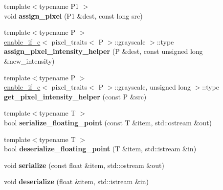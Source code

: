 \begin{DoxyCompactItemize}
\item 
\hypertarget{namespacedlib_a5f5a56be49a2fdda3449976b8234ec72}{
{\footnotesize template$<$typename P1 $>$ }\\void {\bfseries assign\_\-pixel} (P1 \&dest, const long src)}
\label{namespacedlib_a5f5a56be49a2fdda3449976b8234ec72}

\item 
\hypertarget{namespacedlib_a93ad558cb34ff5f74d81a831b4a71bc3}{
{\footnotesize template$<$typename P $>$ }\\\hyperlink{structboost_1_1enable__if__c}{enable\_\-if\_\-c}$<$ pixel\_\-traits$<$ P $>$::grayscale $>$::type {\bfseries assign\_\-pixel\_\-intensity\_\-helper} (P \&dest, const unsigned long \&new\_\-intensity)}
\label{namespacedlib_a93ad558cb34ff5f74d81a831b4a71bc3}

\item 
\hypertarget{namespacedlib_a3f6926b9bee52d60483f299adc4bf25e}{
{\footnotesize template$<$typename P $>$ }\\\hyperlink{structboost_1_1enable__if__c}{enable\_\-if\_\-c}$<$ pixel\_\-traits$<$ P $>$::grayscale, unsigned long $>$::type {\bfseries get\_\-pixel\_\-intensity\_\-helper} (const P \&src)}
\label{namespacedlib_a3f6926b9bee52d60483f299adc4bf25e}

\item 
\hypertarget{namespacedlib_a0de1a663136d3a8c409bd1115252defe}{
{\footnotesize template$<$typename T $>$ }\\bool {\bfseries serialize\_\-floating\_\-point} (const T \&item, std::ostream \&out)}
\label{namespacedlib_a0de1a663136d3a8c409bd1115252defe}

\item 
\hypertarget{namespacedlib_a62cc4e230a3ceead473b81ab10cc92d9}{
{\footnotesize template$<$typename T $>$ }\\bool {\bfseries deserialize\_\-floating\_\-point} (T \&item, std::istream \&in)}
\label{namespacedlib_a62cc4e230a3ceead473b81ab10cc92d9}

\item 
\hypertarget{namespacedlib_a60d8087da7a2b5ceee84fea3b9765fe8}{
void {\bfseries serialize} (const float \&item, std::ostream \&out)}
\label{namespacedlib_a60d8087da7a2b5ceee84fea3b9765fe8}

\item 
\hypertarget{namespacedlib_a633c78678b1b8e042930c3bcdc3ddf14}{
void {\bfseries deserialize} (float \&item, std::istream \&in)}
\label{namespacedlib_a633c78678b1b8e042930c3bcdc3ddf14}


\end{DoxyCompactItemize}
